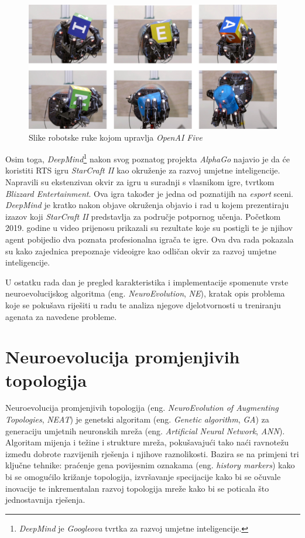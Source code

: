 \documentclass[times, utf8, diplomski, numeric]{fer}
\begin{document}
\begin{figure}
  \includegraphics[width=\textwidth]{slika3}
  \caption{Slike robotske ruke kojom upravlja \textit{OpenAI Five}}
  \label{slika3}
\end{figure}

Osim toga, \textit{DeepMind}\footnote{\textit{DeepMind} je \textit{Googleova} tvrtka za razvoj umjetne inteligencije.} nakon svog poznatog projekta \textit{AlphaGo} najavio je da će koristiti RTS igru \textit{StarCraft II} kao okruženje za razvoj umjetne inteligencije. Napravili su ekstenzivan okvir za igru u suradnji s vlasnikom igre, tvrtkom \textit{Blizzard Entertainment}. Ova igra također je jedna od poznatijih na \textit{esport} sceni. \textit{DeepMind} je kratko nakon objave okruženja objavio i rad \citep{rad8} u kojem prezentiraju izazov koji \textit{StarCraft II} predstavlja za područje potpornog učenja. Početkom 2019. godine u video prijenosu prikazali su rezultate koje su postigli te je njihov agent pobijedio dva poznata profesionalna igrača te igre. Ova dva rada pokazala su kako zajednica prepoznaje videoigre kao odličan okvir za razvoj umjetne inteligencije.

U ostatku rada dan je pregled karakteristika i implementacije spomenute vrste neuroevolucijskog algoritma (eng. \textit{NeuroEvolution}, \textit{NE}), kratak opis problema koje se pokušava riješiti u radu te analiza njegove djelotvornosti u treniranju agenata za navedene probleme.

\chapter{Neuroevolucija promjenjivih topologija}
Neuroevolucija promjenjivih topologija (eng. \textit{NeuroEvolution of Augmenting Topologies}, \textit{NEAT}) je genetski algoritam (eng. \textit{Genetic algorithm}, \textit{GA}) za generaciju umjetnih neuronskih mreža (eng. \textit{Artificial Neural Network}, \textit{ANN}). Algoritam mijenja i težine i strukture mreža, pokušavajući tako naći ravnotežu između dobrote razvijenih rješenja i njihove raznolikosti. Bazira se na primjeni tri ključne tehnike: praćenje gena povijesnim oznakama (eng. \textit{history markers}) kako bi se omogućilo križanje topologija, izvršavanje specijacije kako bi se očuvale inovacije te inkrementalan razvoj topologija mreže kako bi se poticala što jednostavnija rješenja.
\end{document}
